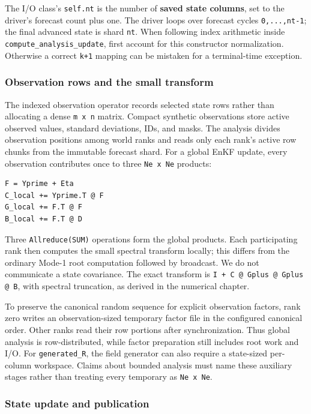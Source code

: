 \documentclass[11pt,a4paper]{article}
\newcommand{\code}[1]{\nolinkurl{#1}}
\begin{document}
The I/O class's \code{self.nt} is the number of \textbf{saved state columns}, set to the driver's forecast count plus one. The driver loops over forecast cycles \code{0,...,nt-1}; the final advanced state is shard \code{nt}. When following index arithmetic inside \code{compute_analysis_update}, first account for this constructor normalization. Otherwise a correct \code{k+1} mapping can be mistaken for a terminal-time exception.

\subsubsection{Observation rows and the small transform}

The indexed observation operator records selected state rows rather than allocating a dense \code{m x n} matrix. Compact synthetic observations store active observed values, standard deviations, IDs, and masks. The analysis divides observation positions among world ranks and reads only each rank's active row chunks from the immutable forecast shard. For a global EnKF update, every observation contributes once to three \code{Ne x Ne} products:

\begin{lstlisting}
F = Yprime + Eta
C_local += Yprime.T @ F
G_local += F.T @ F
B_local += F.T @ D
\end{lstlisting}

Three \code{Allreduce(SUM)} operations form the global products. Each participating rank then computes the small spectral transform locally; this differs from the ordinary Mode-1 root computation followed by broadcast. We do not communicate a state covariance. The exact transform is \code{I + C @ Gplus @ Gplus @ B}, with spectral truncation, as derived in the numerical chapter.

To preserve the canonical random sequence for explicit observation factors, rank zero writes an observation-sized temporary factor file in the configured canonical order. Other ranks read their row portions after synchronization. Thus global analysis is row-distributed, while factor preparation still includes root work and I/O. For \code{generated_R}, the field generator can also require a state-sized per-column workspace. Claims about bounded analysis must name these auxiliary stages rather than treating every temporary as \code{Ne x Ne}.

\subsubsection{State update and publication}
\end{document}
